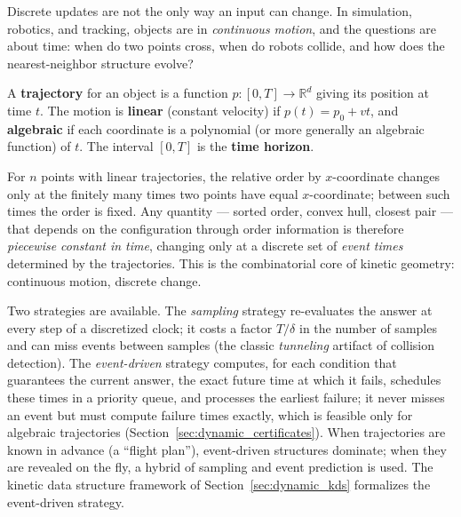 Discrete updates are not the only way an input can change. In simulation,
robotics, and tracking, objects are in \emph{continuous motion}, and the
questions are about time: when do two points cross, when do robots collide,
and how does the nearest-neighbor structure evolve?

\begin{definition}[Trajectory]\label{def:kinetic_trajectory}
  A \textbf{trajectory} for an object is a function $p: [0, T] \to
  \mathbb{R}^d$ giving its position at time $t$. The motion is \textbf{linear}
  (constant velocity) if $p(t) = p_0 + vt$, and \textbf{algebraic} if each
  coordinate is a polynomial (or more generally an algebraic function) of
  $t$. The interval $[0, T]$ is the \textbf{time horizon}.
\end{definition}

\begin{example}\label{ex:kinetic_motivating}
  For $n$ points with linear trajectories, the relative order by
  $x$-coordinate changes only at the finitely many times two points have
  equal $x$-coordinate; between such times the order is fixed. Any quantity
  --- sorted order, convex hull, closest pair --- that depends on the
  configuration through order information is therefore \emph{piecewise
  constant in time}, changing only at a discrete set of \emph{event times}
  determined by the trajectories. This is the combinatorial core of kinetic
  geometry: continuous motion, discrete change.
\end{example}

Two strategies are available. The \emph{sampling} strategy re-evaluates the
answer at every step of a discretized clock; it costs a factor $T/\delta$
in the number of samples and can miss events between samples (the classic
\emph{tunneling} artifact of collision detection). The \emph{event-driven}
strategy computes, for each condition that guarantees the current answer,
the exact future time at which it fails, schedules these times in a priority
queue, and processes the earliest failure; it never misses an event but must
compute failure times exactly, which is feasible only for algebraic
trajectories (Section~\ref{sec:dynamic_certificates}). When trajectories are
known in advance (a ``flight plan''), event-driven structures dominate; when
they are revealed on the fly, a hybrid of sampling and event prediction is
used. The kinetic data structure framework of Section~\ref{sec:dynamic_kds}
formalizes the event-driven strategy.


